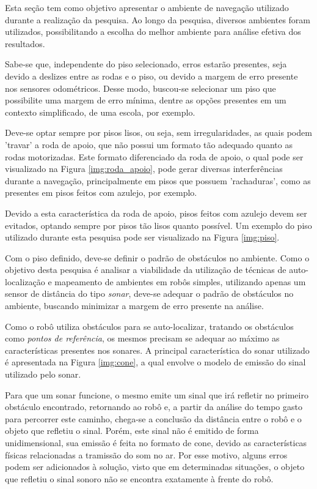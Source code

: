 	Esta seção tem como objetivo apresentar o ambiente de navegação utilizado durante a realização da pesquisa. Ao longo da pesquisa, diversos ambientes foram utilizados, possibilitando a escolha do melhor ambiente para análise efetiva dos resultados.

	Sabe-se que, independente do piso selecionado, erros estarão presentes, seja devido a deslizes entre as rodas e o piso, ou devido a margem de erro presente nos sensores odométricos. Desse modo, buscou-se selecionar um piso que possibilite uma margem de erro mínima, dentre as opções presentes em um contexto simplificado, de uma escola, por exemplo.

	Deve-se optar sempre por pisos lisos, ou seja, sem irregularidades, as quais podem 'travar' a roda de apoio, que não possui um formato tão adequado quanto as rodas motorizadas. Este formato diferenciado da roda de apoio, o qual pode ser visualizado na Figura \ref{img:roda_apoio}, pode gerar diversas interferências durante a navegação, principalmente em pisos que possuem 'rachaduras', como as presentes em pisos feitos com azulejo, por exemplo.

	Devido a esta característica da roda de apoio, pisos feitos com azulejo devem ser evitados, optando sempre por pisos tão lisos quanto possível. Um exemplo do piso utilizado durante esta pesquisa pode ser visualizado na Figura \ref{img:piso}.

	Com o piso definido, deve-se definir o padrão de obstáculos no ambiente. Como o objetivo desta pesquisa é analisar a viabilidade da utilização de técnicas de auto-localização e mapeamento de ambientes em robôs simples, utilizando apenas um sensor de distância do tipo \textit{sonar}, deve-se adequar o padrão de obstáculos no ambiente, buscando minimizar a margem de erro presente na análise.

	Como o robô utiliza obstáculos para se auto-localizar, tratando os obstáculos como \textit{pontos de referência}, os mesmos precisam se adequar ao máximo as características presentes nos sonares. A principal característica do sonar utilizado é apresentada na Figura \ref{img:cone}, a qual envolve o modelo de emissão do sinal utilizado pelo sonar.

	Para que um sonar funcione, o mesmo emite um sinal que irá refletir no primeiro obstáculo encontrado, retornando ao robô e, a partir da análise do tempo gasto para percorrer este caminho, chega-se a conclusão da distância entre o robô e o objeto que refletiu o sinal. Porém, este sinal não é emitido de forma unidimensional, sua emissão é feita no formato de cone, devido as características físicas relacionadas a tramissão do som no ar. Por esse motivo, alguns erros podem ser adicionados à solução, visto que em determinadas situações, o objeto que refletiu o sinal sonoro não se encontra exatamente à frente do robô.

